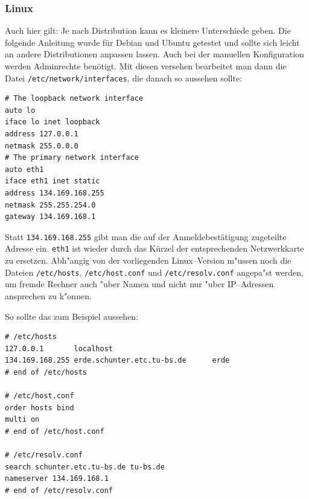 



\newpage
\subsubsection{Linux}
\small{Auch hier gilt: Je nach Distribution kann es kleinere Unterschiede
geben. Die folgende Anleitung wurde für Debian und Ubuntu getestet und
sollte sich leicht an andere Distributionen anpassen lassen.}
Auch bei der manuellen Konfiguration werden Adminrechte benötigt. 
Mit diesen versehen bearbeitet man dann die Datei
\texttt{/etc/network/interfaces}, die danach so aussehen sollte:
\begin{verbatim}
# The loopback network interface
auto lo
iface lo inet loopback
address 127.0.0.1
netmask 255.0.0.0
# The primary network interface
auto eth1
iface eth1 inet static
address 134.169.168.255
netmask 255.255.254.0
gateway 134.169.168.1
\end{verbatim}
Statt \texttt{134.169.168.255} gibt man die auf der Anmeldebestätigung
zugeteilte Adresse ein. \texttt{eth1} ist wieder durch das Kürzel der
entsprechenden Netzwerkkarte zu ersetzen. 
Abh"angig von der vorliegenden \glossar Linux--Version m"ussen noch die Dateien
\texttt{/etc/hosts}, \texttt{/etc/host.conf} und \texttt{/etc/resolv.conf}
angepa"st werden, um fremde Rechner auch "uber Namen und nicht nur "uber
IP--Adressen ansprechen zu k"onnen.

So sollte das zum Beispiel aussehen: 

\begin{verbatim}
# /etc/hosts
127.0.0.1       localhost
134.169.168.255 erde.schunter.etc.tu-bs.de      erde
# end of /etc/hosts

# /etc/host.conf
order hosts bind
multi on
# end of /etc/host.conf

# /etc/resolv.conf
search schunter.etc.tu-bs.de tu-bs.de
nameserver 134.169.168.1
# end of /etc/resolv.conf
\end{verbatim}

